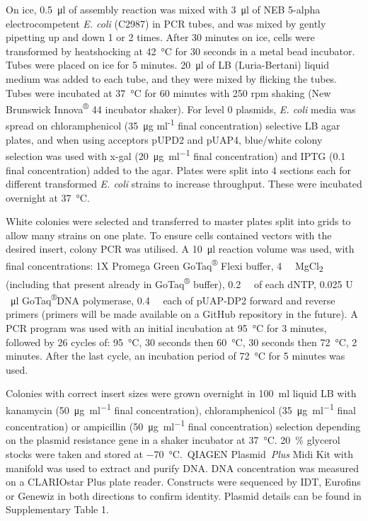 On ice, \SI{0.5}{\micro\litre} of assembly reaction was mixed with \SI{3}{\micro\litre} of NEB 5-alpha
electrocompetent \textit{E. coli} (C2987) in PCR tubes, and was mixed by
gently pipetting up and down 1 or 2 times. After 30 minutes on ice,
cells were transformed by heatshocking at \SI{42}{\degreeCelsius} for 30
seconds in a metal bead incubator. Tubes were placed on ice for 5
minutes. \SI{20}{\micro\litre} of LB (Luria-Bertani) liquid medium was added to each
tube, and they were mixed by flicking the tubes. Tubes were incubated at
\SI{37}{\degreeCelsius} for 60 minutes with 250 rpm shaking (New
Brunswick Innova\textsuperscript{®} 44 incubator shaker). For level 0
plasmids, \textit{E. coli} media was spread on chloramphenicol (\SI{35}{\micro\gram}
ml\textsuperscript{-1} final concentration) selective LB agar plates,
and when using acceptors pUPD2 and pUAP4, blue/white colony selection
was used with x-gal (\SI{20}{\micro\gram\per\ml} final concentration)
and IPTG (\SI{0.1}{\milli\Molar} final concentration) added to the agar. Plates were
split into 4 sections each for different transformed \textit{E. coli}
strains to increase throughput. These were incubated overnight at \SI{37}{\degreeCelsius}.

White colonies were selected and transferred to master plates split into
grids to allow many strains on one plate. To ensure cells contained
vectors with the desired insert, colony PCR was utilised. A \SI{10}{\micro\litre}
reaction volume was used, with final concentrations: 1X Promega Green
GoTaq\textsuperscript{®} Flexi buffer, \SI{4}{\milli\Molar} MgCl\textsubscript{2}
(including that present already in GoTaq\textsuperscript{®} buffer), \SI{0.2}{\milli\Molar} of each dNTP, 0.025 U \si{\per\micro\litre}
GoTaq\textsuperscript{®}DNA polymerase, \SI{0.4}{\milli\Molar} each of pUAP\hyp{}DP2 forward
and reverse primers (primers will be made available on a GitHub
repository in the future). A PCR program was used with an initial
incubation at \SI{95}{\degreeCelsius} for 3 minutes, followed by 26
cycles of: \SI{95}{\degreeCelsius}, 30 seconds then \SI{60}{\degreeCelsius}, 30 seconds then \SI{72}{\degreeCelsius}, 2
minutes. After the last cycle, an incubation period of \SI{72}{\degreeCelsius} for 5 minutes was used.

Colonies with correct insert sizes were grown overnight in \SI{100}{\ml} liquid
LB with kanamycin (\SI{50}{\micro\gram\per\ml} final concentration),
chloramphenicol (\SI{35}{\micro\gram\per\ml} final concentration) or
ampicillin (\SI{50}{\micro\gram\per\ml} final concentration) selection
depending on the plasmid resistance gene in a shaker incubator at
\SI{37}{\degreeCelsius}. \SI{20}{\percent} glycerol stocks were taken and stored at
\SI{-70}{\degreeCelsius}.~QIAGEN Plasmid~\textit{Plus} Midi Kit with
manifold was used to extract and purify DNA. DNA concentration was
measured on a CLARIOstar Plus plate reader. Constructs were sequenced by
IDT, Eurofins or Genewiz in both directions to confirm identity. Plasmid
details can be found in {Supplementary Table 1}.

